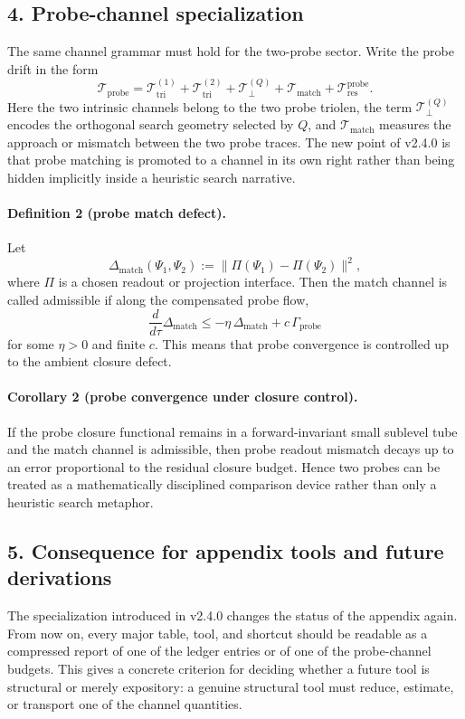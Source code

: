 \subsection*{4. Probe-channel specialization}
The same channel grammar must hold for the two-probe sector. Write the probe drift
in the form
\[
\mathcal T_{\mathrm{probe}} =
\mathcal T_{\mathrm{tri}}^{(1)} +
\mathcal T_{\mathrm{tri}}^{(2)} +
\mathcal T_{\perp}^{(Q)} +
\mathcal T_{\mathrm{match}} +
\mathcal T_{\mathrm{res}}^{\mathrm{probe}}.
\]
Here the two intrinsic channels belong to the two probe triolen, the term
$\mathcal T_{\perp}^{(Q)}$ encodes the orthogonal search geometry selected by $Q$,
and $\mathcal T_{\mathrm{match}}$ measures the approach or mismatch between the two
probe traces. The new point of v2.4.0 is that probe matching is promoted to
a channel in its own right rather than being hidden implicitly inside a heuristic
search narrative.

\paragraph{Definition 2 (probe match defect).}
Let
\[
\Delta_{\mathrm{match}}(\Psi_1,\Psi_2)
:= \|\Pi(\Psi_1)-\Pi(\Psi_2)\|^2,
\]
where $\Pi$ is a chosen readout or projection interface. Then the match channel is
called admissible if along the compensated probe flow,
\[
\frac{d}{d\tau}\Delta_{\mathrm{match}}
\le -\eta\,\Delta_{\mathrm{match}} + c\,\Gamma_{\mathrm{probe}}
\]
for some $\eta>0$ and finite $c$.
This means that probe convergence is controlled up to the ambient closure defect.

\paragraph{Corollary 2 (probe convergence under closure control).}
If the probe closure functional remains in a forward-invariant small sublevel tube
and the match channel is admissible, then probe readout mismatch decays up to an
error proportional to the residual closure budget. Hence two probes can be treated
as a mathematically disciplined comparison device rather than only a heuristic
search metaphor.

\subsection*{5. Consequence for appendix tools and future derivations}
The specialization introduced in v2.4.0 changes the status of the appendix
again. From now on, every major table, tool, and shortcut should be readable as a
compressed report of one of the ledger entries or of one of the probe-channel
budgets. This gives a concrete criterion for deciding whether a future tool is
structural or merely expository: a genuine structural tool must reduce, estimate,
or transport one of the channel quantities.

